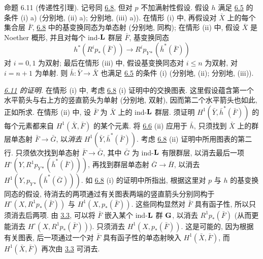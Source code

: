\begin{enonce*}{命题 6.11}
(传递性引理). 记号同 \hyperref[XII.prop6.8]{6.8}, 但对 $p$ 不加满射性假设. 假设 $h$ 满足 \hyperref[XII.prop6.5]{6.5} 的条件 \textup{(i) a)} (分别地, \textup{(ii) a)}; 分别地, \textup{(iii) a)}). 在情形 \textup{(i)} 中, 再假设对 $\bar{X}$ 上的每个集合层 $\bar{F}$, \hyperref[XII.prop6.8]{6.8} 中的基变换同态为单态射 (分别地, 同构); 在情形 \textup{(ii)} 中, 假设 $\bar{X}$ 是 Noether 概形, 并且对每个 ind-$\mathbf{L}$ 群层 $\bar{F}$, 基变换同态
$$
h^{\ast}(R^ip_{\ast}(\bar{F}))\longrightarrow
R^ip_{Y\ast}(\bar{h}^{\ast}(\bar{F}))
$$
对 $i=0,1$ 为\pageoriginale 双射; 最后在情形 \textup{(iii)} 中, 假设基变换同态对 $i\leq n$ 为双射, 对 $i=n+1$ 为单射. 则 $\bar{h}:\bar{Y}\rightarrow\bar{X}$ 也满足 \hyperref[XII.prop6.5]{6.5} 的条件 \textup{(i)} (分别地, \textup{(ii)}; 分别地, \textup{(iii)}).
\end{enonce*}

\noindent
\emph{\hyperref[XII.prop6.11]{6.11} 的证明.} 在情形 (i) 中, 考虑 \hyperref[XII.prop6.8]{6.8} (i) 证明中的交换图表. 这里假设蕴含第一个水平箭头与右上方的竖直箭头为单射 (分别地, 双射), 因而第二个水平箭头也如此, 正如所求. 在情形 (ii) 中, 设 $\bar{F}$ 为 $\bar{X}$ 上的 ind-$\mathbf{L}$ 群层. 须证明 $H^1(\bar{Y},\bar{h}^{\ast}(\bar{F}))$ 的每个元素都来自 $H^1(\bar{X},\bar{F})$ 的某个元素. 将 \hyperref[XII.cor6.6]{6.6} (ii) 应用于 $\bar{h}$, 只须找到 $\bar{X}$ 上的群层单态射 $\bar{F}\rightarrow\bar{G}$, 以\emph{消去} $H^1(\bar{Y},\bar{h}^{\ast}(\bar{F}))$. 考虑 \hyperref[XII.prop6.8]{6.8} (ii) 证明中所用图表的第二行. 只须依次找到单态射 $\bar{F}\rightarrow\bar{G}$, 其中 $\bar{G}$ 为 ind-$\mathbf{L}$ 有限群层, 以消去最后一项 $H^{\circ}(Y,R^1p_{Y\ast}(\bar{h}^{\ast}(\bar{F})))$, 再找到群层单态射 $\bar{G}\rightarrow\bar{H}$, 以消去 $H^1(Y,p_{Y\ast}(\bar{h}^{\ast}(\bar{G})))$. 如 \hyperref[XII.prop6.8]{6.8} (i) 的证明中所指出, 根据这里对 $p$ 与 $h$ 的基变换同态的假设, 待消去的两项通过有关图表两端的竖直箭头分别同构于 $H^{\circ}(X,R^1p_{\ast}(\bar{F}))$ 与 $H^1(X,p_{\ast}(\bar{F}))$. 这些同构显然对 $\bar{F}$ 具有函子性, 所以只须消去后两项. 由 \hyperref[XII.prop3.3]{3.3}, 可以将 $\bar{F}$ 嵌入某个 ind-$\mathbf{L}$ 群 $\mathbf{G}$, 以消去 $R^1p_{\ast}(\bar{F})$ (从而更能消去 $H^{\circ}(X,R^1p_{\ast}(\bar{F}))$). 只须消去 $H^1(X,p_{\ast}(\bar{F}))$. 这是可能的, 因为\pageoriginale 根据有关图表, 后一项通过一个对 $\bar{F}$ 具有函子性的单态射映入 $H^1(\bar{X},\bar{F})$, 而 $H^1(\bar{X},\bar{F})$ 再次由 \hyperref[XII.prop3.3]{3.3} 可消去.

